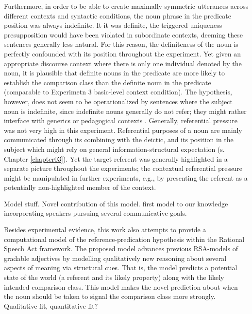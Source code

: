 Furthermore, in order to be able to create maximally symmetric utterances across different contexts and syntactic conditions, the noun phrase in the predicate position was always indefinite. It it was definite, the triggered uniqueness presupposition would have been violated in subordinate contexts, deeming these sentences generally less natural. 
For this reason, the definiteness of the noun is perfectly confounded with its position throughout the experiment. Yet given an appropriate discourse context where there is only one individual denoted by the noun, it is plausible that definite nouns in the predicate are more likely to establish the comparison class than the definite noun in the predicate (comparable to Experimetn 3 basic-level context condition). The hypothesis, however, does not seem to be operationalized by sentences where the subject noun is indefinite, since indefinite nouns generally do not refer; they might rather interface with generics or pedagogical contexts \parencite{Reboul2001, tessler2019language}. 
 Generally, referential pressure was not very high in this experiment. Referential purposes of a noun are mainly communicated through its combining with the deictic, and its position in the subject which might rely on general information-structural expectation (s. Chapter \ref{chapter03}). Yet the target referent was generally highlighted in a separate picture throughout the experiments; the contextual referential pressure might be manipulated in further experiments, e.g., by presenting the referent as a potentially non-highlighted member of the context. 


Model stuff. 
Novel contribution of this model.   
first model to our knowledge incorporating speakers pursuing several communicative goals. 

Besides experimental evidence, this work also attempts to provide a computational model of the reference-predication hypothesis within the Rational Speech Act framework. The proposed model advances previous RSA-models of gradable adjectives by modelling qualitatively new reasoning about several aspects of meaning via structural cues. That is, the model predicts a potential state of the world (a referent and its likely property) along with the likely intended  comparison class.  This model makes the novel prediction about when the noun should be taken to signal the comparison class more strongly. Qualitative fit, quantitative fit?

